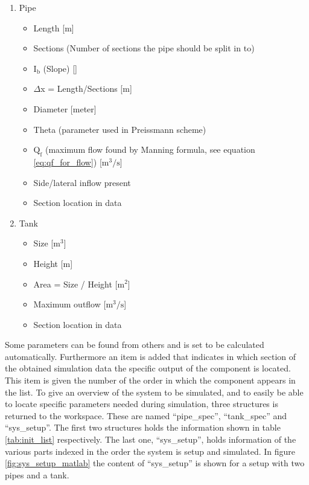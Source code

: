 \begin{enumerate} \label{tab:init_list}
	\item Pipe
	\begin{itemize}
		\item Length [m]
		\item Sections (Number of sections the pipe should be split in to)
		\item $\text{I}_\text{b}$ (Slope) [\textperthousand]
		\item $\Delta$x = Length/Sections [m]
		\item Diameter [meter]
		\item Theta (parameter used in Preissmann scheme)
		\item $\text{Q}_{\text{f}}$ (maximum flow found by Manning formula, see equation \ref{eq:qf_for_flow}) [$\text{m}^\text{3}/\text{s}$]
		\item Side/lateral inflow present 
		\item Section location in data 
	\end{itemize}
	\item Tank
	\begin{itemize}
		\item Size [$\text{m}^\text{3}$]
		\item Height [m]
		\item Area = Size / Height [$\text{m}^\text{2}$]
		\item Maximum outflow [$\text{m}^\text{3}/\text{s}$]
		\item Section location in data 
	\end{itemize}
\end{enumerate}

Some parameters can be found from others and is set to be calculated automatically. Furthermore an item is added that indicates in which section of the obtained simulation data the specific output of the component is located. This item is given the number of the order in which the component appears in the list. To give an overview of the system to be simulated, and to easily be able to locate specific parameters needed during simulation, three structures is returned to the workspace. These are named ``pipe\_spec'', ``tank\_spec'' and ``sys\_setup''. The first two structures holds the information shown in table \ref{tab:init_list} respectively. The last one, ``sys\_setup'', holds information of the various parts indexed in the order the system is setup and simulated. In figure \ref{fig:sys_setup_matlab} the content of ``sys\_setup'' is shown for a setup with two pipes and a tank.

